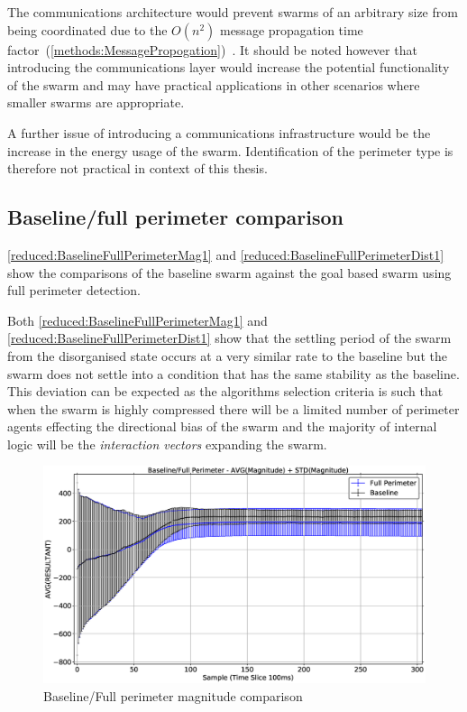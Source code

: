 The communications architecture would prevent swarms of an arbitrary size from being coordinated due to the $O(n^{2})$ message propagation time factor~(\autoref{methods:MessagePropogation})~\cite{SHA:07}. It should be noted however that introducing the communications layer would increase the potential functionality of the swarm and may have practical applications in other scenarios where smaller swarms are appropriate. 

A further issue of introducing a communications infrastructure would be the increase in the energy usage of the swarm. Identification of the perimeter type is therefore not practical in context of this thesis.

\subsection{Baseline/full perimeter comparison\label{section:compareBaselineFullPerimeter}}
\autoref{reduced:BaselineFullPerimeterMag1} and \autoref{reduced:BaselineFullPerimeterDist1} show the comparisons of the baseline swarm against the goal based swarm using full perimeter detection. 

Both \autoref{reduced:BaselineFullPerimeterMag1} and \autoref{reduced:BaselineFullPerimeterDist1} show that the settling period of the swarm from the disorganised state occurs at a very similar rate to the baseline but the swarm does not settle into a condition that has the same stability as the baseline. This deviation can be expected as the algorithms selection criteria is such that when the swarm is highly compressed there will be a limited number of perimeter agents effecting the directional bias of the swarm and the majority of internal logic will be the \textit{interaction vectors} expanding the swarm.

\begin{figure}[H]
\begin{center}
\includegraphics[width=14cm]{CHAPTER-6/figures/BaselineFullPerimeterMag1}
\end{center}
\caption{Baseline/Full perimeter magnitude comparison\label{reduced:BaselineFullPerimeterMag1}}
\end{figure}

